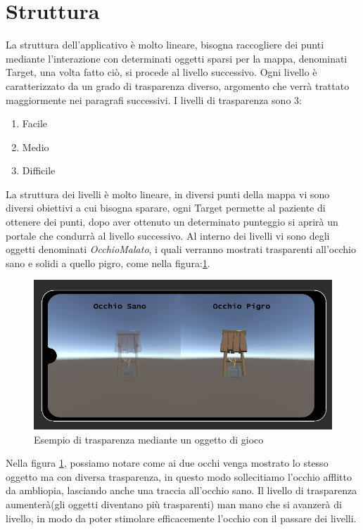 \documentclass[
a4paper,
cleardoublepage=empty,
headings=twolinechapter,
numbers=autoenddot,
]{scrbook}
\begin{document}
	\section{Struttura}
	La struttura dell'applicativo è molto lineare, bisogna raccogliere dei punti mediante l'interazione con determinati oggetti sparsi per la mappa, denominati Target, una volta fatto ciò, si procede al livello successivo.
	Ogni livello è caratterizzato da un grado di trasparenza diverso, argomento che verrà trattato maggiormente nei paragrafi successivi.
	I livelli di trasparenza sono 3:
	\begin{enumerate}
		\item Facile
		\item Medio
		\item Difficile
	\end{enumerate}
	La struttura dei livelli è molto lineare, in diversi punti della mappa vi sono diversi obiettivi a cui bisogna sparare, ogni Target permette al paziente di ottenere dei punti, dopo aver ottenuto un determinato punteggio si aprirà un portale che condurrà al livello successivo.
	Al interno dei livelli vi sono degli oggetti denominati \textit{OcchioMalato}, i quali verranno mostrati trasparenti all'occhio sano e solidi a quello pigro, come nella figura:\ref{fig:pozzo}. 
	\begin{figure}[H]
		\centering
		\includegraphics[width=0.8\linewidth]{image/Pr_trasparenza}
		\caption{Esempio di trasparenza mediante un oggetto di gioco}
		\label{fig:pozzo}
	\end{figure}
	Nella figura \ref{fig:pozzo}, possiamo notare come ai due occhi venga mostrato lo stesso oggetto ma con diversa trasparenza, in questo modo sollecitiamo l'occhio afflitto da ambliopia, lasciando anche una traccia all'occhio sano.
	Il livello di trasparenza aumenterà(gli oggetti diventano più trasparenti) man mano che si avanzerà di livello, in modo da poter stimolare efficacemente l'occhio con il passare dei livelli.
\end{document}
